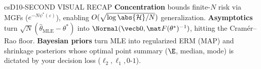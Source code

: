 \documentclass[../../../../master.tex]{subfiles}
\begin{document}
\begin{cscolumns}
\begin{cscard}{csD}{10-SECOND VISUAL RECAP}
  \sffamily\footnotesize
  \textbf{Concentration} bounds finite-$N$ risk via MGFs ($e^{-N\psi^*(\varepsilon)}$), enabling $O(\sqrt{\log\abs{\mathcal H}/N})$ generalization.
  \textbf{Asymptotics} turn $\sqrt N(\hat\theta_{\mathrm{MLE}}-\theta^*)$ into $\Normal(\vecb 0, \mat F(\theta^*)^{-1})$, hitting the Cram\'er--Rao floor.
  \textbf{Bayesian priors} turn MLE into regularized ERM (MAP) and shrinkage posteriors whose optimal point summary ($\E$, median, mode) is dictated by your decision loss ($\ell_2, \ell_1, 0\text{-}1$).
\end{cscard}
\end{cscolumns}

\csend
\end{document}
